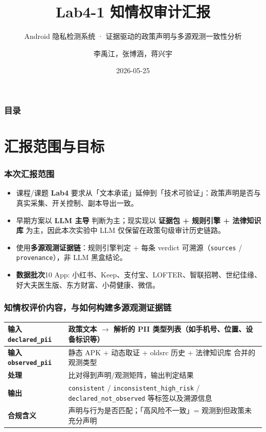 \documentclass[AutoFakeBold,AutoFakeSlant]{beamer}
\author{李禹江，张博涵，蒋兴宇}
\title{Lab4-1 知情权审计汇报}
\subtitle{Android 隐私检测系统 · 证据驱动的政策声明与多源观测一致性分析}
\institute{我的刀盾队}
\date{2026-05-25}
\begin{document}
\kaishu

\begin{frame}
    \titlepage
\end{frame}

\begin{frame}
    \frametitle{目录}
    \tableofcontents
\end{frame}

\section{汇报范围与目标}

\begin{frame}
    \frametitle{本次汇报范围}
    \small
    \begin{itemize}
        \item 课程/课题 \textbf{Lab4} 要求从「文本承诺」延伸到「技术可验证」：政策声明是否与真实采集、开关控制、副本导出一致。
        \item 早期方案以 \textbf{LLM 主导} 判断为主；现实现以 \textbf{证据包 + 规则引擎 + 法律知识库} 为主，因此本次实验中 LLM 仅保留在政策句级审计历史链路。
        \item 使用\textbf{多源观测证据链}：规则引擎判定 + 每条 verdict 可溯源（\texttt{sources} / \texttt{provenance}），非 LLM 黑盒结论。
        \item \textbf{数据批次}10 App: 小红书、Keep、支付宝、LOFTER、智联招聘、世纪佳缘、好大夫医生版、东方财富、小荷健康、微信。
    \end{itemize}
\end{frame}

\begin{frame}
    \frametitle{知情权评价内容，与如何构建多源观测证据链}
    \small
    \begin{tabularx}{\textwidth}{|l|X|}
        \hline
        \textbf{输入 \texttt{declared\_pii}} & 政策文本 $\rightarrow$ 解析的 PII 类型列表（如手机号、位置、设备标识等） \\
        \hline
        \textbf{输入 \texttt{observed\_pii}} & 静态 APK + 动态取证 + oldsrc 历史 + 法律知识库 合并的观测类型 \\
        \hline
        \textbf{处理} & 比对得到声明/观测矩阵，输出判定结果 \\
        \hline
        \textbf{输出} & \texttt{consistent} / \texttt{inconsistent\_high\_risk} / \texttt{declared\_not\_observed} 等标签以及溯源信息 \\
        \hline
        \textbf{合规含义} & 声明与行为是否匹配；「高风险不一致」= 观测到但政策未充分声明 \\
        \hline
    \end{tabularx}
\end{frame}
\end{document}
